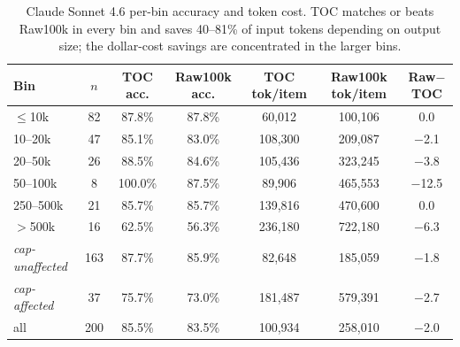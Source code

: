 \documentclass{article}
\begin{document}
\begin{table}[h]
\centering
\scriptsize
\setlength{\tabcolsep}{4pt}
\begin{tabular}{lcccccc}
\toprule
Bin & $n$ & TOC acc. & Raw100k acc. & TOC tok/item & Raw100k tok/item & Raw$-$TOC \\
\midrule
$\le$10k & 82 & 87.8\% & 87.8\% & 60{,}012 & 100{,}106 & 0.0 \\
10--20k & 47 & 85.1\% & 83.0\% & 108{,}300 & 209{,}087 & $-$2.1 \\
20--50k & 26 & 88.5\% & 84.6\% & 105{,}436 & 323{,}245 & $-$3.8 \\
50--100k & 8 & 100.0\% & 87.5\% & 89{,}906 & 465{,}553 & $-$12.5 \\
250--500k & 21 & 85.7\% & 85.7\% & 139{,}816 & 470{,}600 & 0.0 \\
$>$500k & 16 & 62.5\% & 56.3\% & 236{,}180 & 722{,}180 & $-$6.3 \\
\midrule
\textit{cap-unaffected} & 163 & 87.7\% & 85.9\% & 82{,}648 & 185{,}059 & $-$1.8 \\
\textit{cap-affected} & 37 & 75.7\% & 73.0\% & 181{,}487 & 579{,}391 & $-$2.7 \\
all & 200 & 85.5\% & 83.5\% & 100{,}934 & 258{,}010 & $-$2.0 \\
\bottomrule
\end{tabular}
\caption{Claude Sonnet 4.6 per-bin accuracy and token cost. TOC matches or beats Raw100k in every bin and saves 40--81\% of input tokens depending on output size; the dollar-cost savings are concentrated in the larger bins.}
\label{tab:appendix-bin-sonnet}
\end{table}
\end{document}
